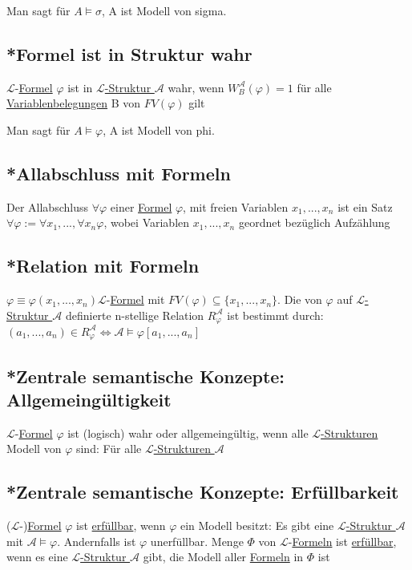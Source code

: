 \documentclass[12pt,a4paper]{article} %
\begin{document}
	Man sagt für $A \hyperref[Erfullbar]{\vDash} \sigma$, A ist Modell von sigma.
	
	\subsection{*Formel ist in Struktur wahr}
	$\mathcal{L}$-\hyperref[Formel]{Formel} $\varphi$ ist in \hyperref[Struktur]{$\mathcal{L}$-Struktur $\mathcal{A}$} wahr, wenn $W_B^{\mathcal{A}}(\varphi) = 1$ für alle \hyperref[Belegung]{Variablenbelegungen} B von $FV(\varphi)$ gilt
	
	Man sagt für $A \hyperref[Erfullbar]{\vDash} \varphi$, A ist Modell von phi.
	
	\subsection{*Allabschluss mit Formeln}
	Der Allabschluss $\forall \varphi$ einer \hyperref[Formel]{Formel} $\varphi$, mit freien Variablen $x_1, ..., x_n$ ist ein Satz $\forall \varphi := \forall x_1, ..., \forall x_n \varphi$, wobei Variablen $x_1, ..., x_n$ geordnet bezüglich Aufzählung
	
	\subsection{*Relation mit Formeln}
	$\varphi \equiv \varphi(x_1, ..., x_n) \mathcal{L}$-\hyperref[Formel]{Formel} mit $FV(\varphi) \subseteq \{x_1, ..., x_n\}$. Die von $\varphi$ auf \hyperref[Struktur]{$\mathcal{L}$-Struktur $\mathcal{A}$} definierte n-stellige Relation $R_{\varphi}^{\mathcal{A}}$ ist bestimmt durch: $(a_1, ..., a_n) \in R_{\varphi}^{\mathcal{A}} \Leftrightarrow \mathcal{A} \hyperref[Erfullbar]{\vDash} \varphi[a_1, ..., a_n]$
	
	\subsection{*Zentrale semantische Konzepte: Allgemeingültigkeit}
	$\mathcal{L}$-\hyperref[Formel]{Formel} $\varphi$ ist (logisch) wahr oder allgemeingültig, wenn alle \hyperref[Struktur]{$\mathcal{L}$-Strukturen} Modell von $\varphi$ sind: Für alle \hyperref[Struktur]{$\mathcal{L}$-Strukturen $\mathcal{A}$}
	
	\subsection{*Zentrale semantische Konzepte: Erfüllbarkeit}
	\begin{tasks}
		\task ($\mathcal{L}$-)\hyperref[Formel]{Formel} $\varphi$ ist \hyperref[Erfullbar]{erfüllbar}, wenn $\varphi$ ein Modell besitzt: Es gibt eine \hyperref[Struktur]{$\mathcal{L}$-Struktur $\mathcal{A}$} mit $\mathcal{A} \hyperref[Erfullbar]{\vDash} \varphi$. Andernfalls ist $\varphi$ unerfüllbar.
		\task Menge $\Phi$ von $\mathcal{L}$-\hyperref[Formel]{Formeln} ist \hyperref[Erfullbar]{erfüllbar}, wenn es eine \hyperref[Struktur]{$\mathcal{L}$-Struktur $\mathcal{A}$} gibt, die Modell aller \hyperref[Formel]{Formeln} in $\Phi$ ist
	\end{tasks}
\end{document}
